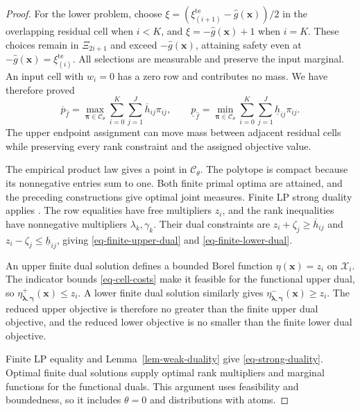 \documentclass[review,11pt,3p,authoryear,nopreprintline]{elsarticle}
\begin{document}
\begin{proof}
  For the lower problem, choose
  $\xi=\left(\xi_{(i+1)}^{\mathrm{te}}-\hat g(\bm x)\right)/2$ in the overlapping residual cell when $i<K$, and $\xi=-\hat g(\bm x)+1$ when $i=K$. These choices remain in $\Xi_{2i+1}$ and exceed $-\hat g(\bm x)$, attaining safety even at $-\hat g(\bm x)=\xi_{(i)}^{\mathrm{te}}$. All selections are measurable and preserve the input marginal. An input cell with $w_i=0$ has a zero row and contributes no mass. We have therefore proved
  \begin{equation}
    \overline p_{\hat f}
    =\max_{\bm\pi\in\mathcal C_\theta}\sum_{i=0}^K\sum_{j=1}^J
      \overline h_{ij}\pi_{ij},\qquad
    \underline p_{\hat f}
    =\min_{\bm\pi\in\mathcal C_\theta}\sum_{i=0}^K\sum_{j=1}^J
      \underline h_{ij}\pi_{ij}.
    \label{eq-finite-primal-values}
  \end{equation}
  The upper endpoint assignment can move mass between adjacent residual cells while preserving every rank constraint and the assigned objective value.

  The empirical product law gives a point in $\mathcal C_\theta$. The polytope is compact because its nonnegative entries sum to one. Both finite primal optima are attained, and the preceding constructions give optimal joint measures. Finite LP strong duality applies \citep[Section~5.2.3]{B.V04}. The row equalities have free multipliers $z_i$, and the rank inequalities have nonnegative multipliers $\lambda_k,\gamma_k$. Their dual constraints are $z_i+\zeta_j\ge\overline h_{ij}$ and $z_i-\zeta_j\le\underline h_{ij}$, giving \eqref{eq-finite-upper-dual} and \eqref{eq-finite-lower-dual}.

  An upper finite dual solution defines a bounded Borel function $\eta(\bm x)=z_i$ on $\mathcal X_i$. The indicator bounds \eqref{eq-cell-costs} make it feasible for the functional upper dual, so $\eta^+_{\bm\lambda,\bm\gamma}(\bm x)\le z_i$. A lower finite dual solution similarly gives $\eta^-_{\bm\lambda,\bm\gamma}(\bm x)\ge z_i$. The reduced upper objective is therefore no greater than the finite upper dual objective, and the reduced lower objective is no smaller than the finite lower dual objective.

  Finite LP equality and Lemma~\ref{lem-weak-duality} give \eqref{eq-strong-duality}. Optimal finite dual solutions supply optimal rank multipliers and marginal functions for the functional duals. This argument uses feasibility and boundedness, so it includes $\theta=0$ and distributions with atoms.
\end{proof}
\end{document}
